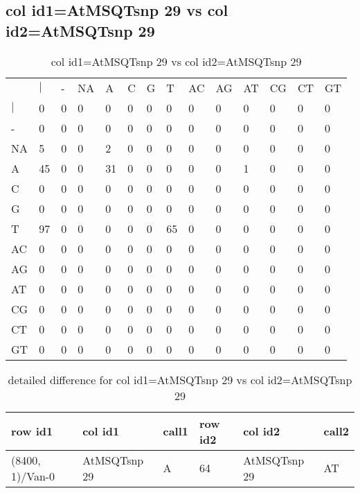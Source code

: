 \subsection{col id1=AtMSQTsnp 29 vs col id2=AtMSQTsnp 29}
\begin{center}
\begin{longtable}{|l|l|l|l|l|l|l|l|l|l|l|l|l|l|}
\caption{col id1=AtMSQTsnp 29 vs col id2=AtMSQTsnp 29} \label{table_dm638}\\
\hline
\\
\hline
&$|$&-&NA&A&C&G&T&AC&AG&AT&CG&CT&GT\\
$|$&0&0&0&0&0&0&0&0&0&0&0&0&0\\
-&0&0&0&0&0&0&0&0&0&0&0&0&0\\
NA&5&0&0&2&0&0&0&0&0&0&0&0&0\\
A&45&0&0&31&0&0&0&0&0&1&0&0&0\\
C&0&0&0&0&0&0&0&0&0&0&0&0&0\\
G&0&0&0&0&0&0&0&0&0&0&0&0&0\\
T&97&0&0&0&0&0&65&0&0&0&0&0&0\\
AC&0&0&0&0&0&0&0&0&0&0&0&0&0\\
AG&0&0&0&0&0&0&0&0&0&0&0&0&0\\
AT&0&0&0&0&0&0&0&0&0&0&0&0&0\\
CG&0&0&0&0&0&0&0&0&0&0&0&0&0\\
CT&0&0&0&0&0&0&0&0&0&0&0&0&0\\
GT&0&0&0&0&0&0&0&0&0&0&0&0&0\\
\hline
\end{longtable}
\end{center}

\begin{center}
\begin{longtable}{|l|l|l|l|l|l|}
\caption{detailed difference for col id1=AtMSQTsnp 29 vs col id2=AtMSQTsnp 29} \label{table_dm639}\\
\hline
row id1&col id1&call1&row id2&col id2&call2\\
\hline
(8400, 1)/Van-0&AtMSQTsnp 29&A&64&AtMSQTsnp 29&AT\\
\hline
\end{longtable}
\end{center}

